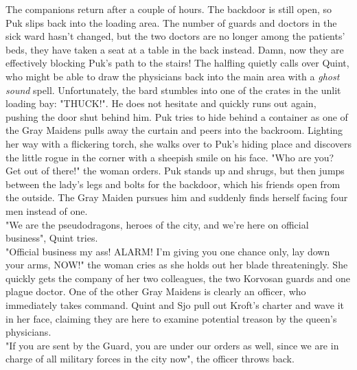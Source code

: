 The companions return after a couple of hours. The backdoor is still open, so Puk slips back into the loading area. The number of guards and doctors in the sick ward hasn't changed, but the two doctors are no longer among the patients' beds, they have taken a seat at a table in the back instead. Damn, now they are effectively blocking Puk's path to the stairs! The halfling quietly calls over Quint, who might be able to draw the physicians back into the main area with a {\itshape ghost sound} spell. Unfortunately, the bard stumbles into one of the crates in the unlit loading bay: "THUCK!". He does not hesitate and quickly runs out again, pushing the door shut behind him. Puk tries to hide behind a container as one of the Gray Maidens pulls away the curtain and peers into the backroom. Lighting her way with a flickering torch, she walks over to Puk's hiding place and discovers the little rogue in the corner with a sheepish smile on his face. "Who are you? Get out of there!" the woman orders. Puk stands up and shrugs, but then jumps between the lady's legs and bolts for the backdoor, which his friends open from the outside. The Gray Maiden pursues him and suddenly finds herself facing four men instead of one.\\

"We are the pseudodragons, heroes of the city, and we're here on official business", Quint tries.\\

"Official business my ass! ALARM! I'm giving you one chance only, lay down your arms, NOW!" the woman cries as she holds out her blade threateningly. She quickly gets the company of her two colleagues, the two Korvosan guards and one plague doctor. One of the other Gray Maidens is clearly an officer, who immediately takes command. Quint and Sjo pull out Kroft's charter and wave it in her face, claiming they are here to examine potential treason by the queen's physicians.\\

"If you are sent by the Guard, you are under our orders as well, since we are in charge of all military forces in the city now", the officer throws back.\\

